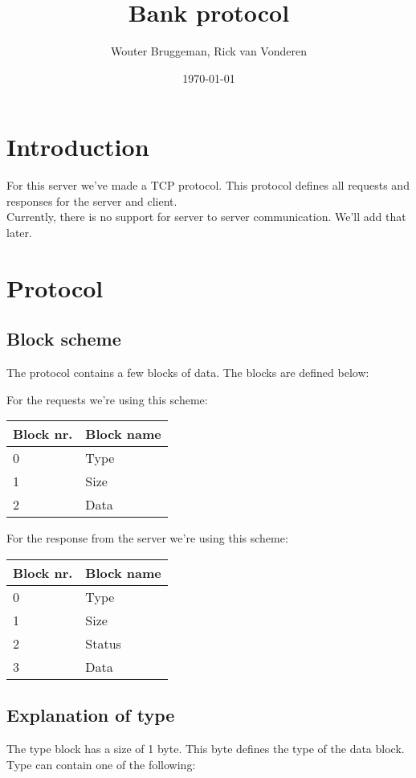\documentclass[12pt]{article}
\title{Bank protocol}
\author{Wouter Bruggeman, Rick van Vonderen}
\date{\today}
\begin{document}
\maketitle
\newpage

\tableofcontents
\newpage

\section{Introduction}
For this server we've made a TCP protocol. This protocol defines all requests
and responses for the server and client.\\
Currently, there is no support for server to server communication. We'll add that later.
\newpage

\section{Protocol} \label{hfst:protocol}
\subsection{Block scheme} \label{hfst:scheme}
The protocol contains a few blocks of data. The blocks are defined below:

For the requests we're using this scheme:\\
\begin{tabular}{| p{2cm} | p{5cm} |}
	\hline
	\textbf{Block nr.} & \textbf{Block name} \\ \hline
	0 & Type \\ \hline
	1 & Size \\ \hline
	2 & Data \\ \hline
\end{tabular}

For the response from the server we're using this scheme:\\
\begin{tabular}{| p{2cm} | p{5cm} |}
	\hline
	\textbf{Block nr.} & \textbf{Block name} \\ \hline
	0 & Type \\ \hline
	1 & Size \\ \hline
	2 & Status \\ \hline
	3 & Data \\ \hline
\end{tabular}

\subsection{Explanation of type} \label{hfst:type}
The type block has a size of 1 byte. This byte defines the type of the data block.\\
Type can contain one of the following:
\end{document}
